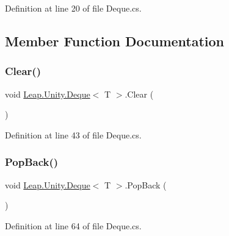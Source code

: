 Definition at line 20 of file Deque.\+cs.



\subsection{Member Function Documentation}
\mbox{\label{class_leap_1_1_unity_1_1_deque_aaefa3c4fb909affdb5a8eee5affbe603}} 
\subsubsection{\texorpdfstring{Clear()}{Clear()}}
{\footnotesize\ttfamily void \mbox{\hyperlink{class_leap_1_1_unity_1_1_deque}{Leap.\+Unity.\+Deque}}$<$ T $>$.Clear (\begin{DoxyParamCaption}{ }\end{DoxyParamCaption})}



Definition at line 43 of file Deque.\+cs.

\mbox{\label{class_leap_1_1_unity_1_1_deque_a88278111a5e6310bdcef74f0f7306260}} 
\subsubsection{\texorpdfstring{PopBack()}{PopBack()}\hspace{0.1cm}{\footnotesize\ttfamily [1/2]}}
{\footnotesize\ttfamily void \mbox{\hyperlink{class_leap_1_1_unity_1_1_deque}{Leap.\+Unity.\+Deque}}$<$ T $>$.Pop\+Back (\begin{DoxyParamCaption}{ }\end{DoxyParamCaption})}



Definition at line 64 of file Deque.\+cs.

\mbox{\label{class_leap_1_1_unity_1_1_deque_ac9dac7bc414537d08841c3134e036e96}} 
